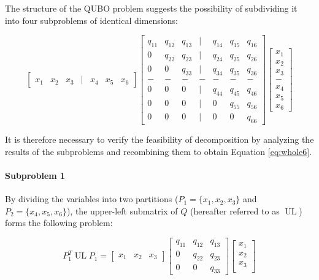The structure of the QUBO problem suggests the possibility of subdividing it into four subproblems of identical dimensions:

\begin{equation}
    \begin{bmatrix}
        x_1 & x_2 & x_3 & | & x_4 & x_5 & x_6
    \end{bmatrix}
    \begin{bmatrix}
        q_{11} & q_{12} & q_{13} & | & q_{14} & q_{15} & q_{16} \\
        0 & q_{22} & q_{23} & | & q_{24} & q_{25} & q_{26} \\
        0 & 0 & q_{33} & | & q_{34} & q_{35} & q_{36} \\
        - & - & - & - & - & -  & - \\
        0 & 0 & 0 & | & q_{44} & q_{45} & q_{46} \\
        0 & 0 & 0 & | & 0 & q_{55} & q_{56} \\
        0 & 0 & 0 & | & 0 & 0 & q_{66}
    \end{bmatrix}
    \begin{bmatrix}
        x_1 \\
        x_2 \\
        x_3 \\
        - \\
        x_4 \\
        x_5 \\
        x_6
    \end{bmatrix}
\end{equation}

It is therefore necessary to verify the feasibility of decomposition by analyzing the results of the subproblems and recombining them to obtain Equation \ref{eq:whole6}.

\paragraph{Subproblem 1}
By dividing the variables into two partitions ($P_1=\{x_1,x_2,x_3\}$ and $P_2=\{x_4,x_5,x_6\}$), the upper-left submatrix of $Q$ (hereafter referred to as $\operatorname{UL}$) forms the following problem:

\begin{equation*}
    P_1^T\operatorname{UL}P_1=
    \begin{bmatrix}
        x_1 & x_2 & x_3
    \end{bmatrix}
    \begin{bmatrix}
        q_{11} & q_{12} & q_{13} \\
        0 & q_{22} & q_{23} \\
        0 & 0 & q_{33}
    \end{bmatrix}
    \begin{bmatrix}
        x_1 \\
        x_2 \\
        x_3 \\
    \end{bmatrix}
\end{equation*}

